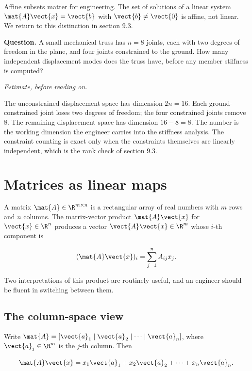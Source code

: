 Affine subsets matter for engineering. The set of solutions of a
linear system $\mat{A}\vect{x} = \vect{b}$ with $\vect{b} \neq
\vect{0}$ is affine, not linear. We return to this distinction in
section 9.3.

\begin{estimation}
\textbf{Question.} A small mechanical truss has $n = 8$ joints, each
with two degrees of freedom in the plane, and four joints constrained
to the ground. How many independent displacement modes does the
truss have, before any member stiffness is computed?

\smallskip
\textit{Estimate, before reading on.}

\smallskip
The unconstrained displacement space has dimension $2n = 16$. Each
ground-constrained joint loses two degrees of freedom; the four
constrained joints remove $8$. The remaining displacement space has
dimension $16 - 8 = 8$. The number is the working dimension the
engineer carries into the stiffness analysis. The constraint
counting is exact only when the constraints themselves are linearly
independent, which is the rank check of section 9.3.
\end{estimation}

\section{Matrices as linear maps}

A matrix $\mat{A} \in \R^{m \times n}$ is a rectangular array of
real numbers with $m$ rows and $n$ columns. The matrix-vector
product $\mat{A}\vect{x}$ for $\vect{x} \in \R^{n}$ produces a
vector $\vect{A}\vect{x} \in \R^{m}$ whose $i$-th component is

\[
(\mat{A}\vect{x})_{i} = \sum_{j=1}^{n} A_{ij} x_{j}.
\]

Two interpretations of this product are routinely useful, and an
engineer should be fluent in switching between them.

\subsection{The column-space view}

Write $\mat{A} = [\vect{a}_{1} \mid \vect{a}_{2} \mid \cdots \mid
\vect{a}_{n}]$, where $\vect{a}_{j} \in \R^{m}$ is the $j$-th column.
Then

\[
\mat{A}\vect{x} = x_{1}\vect{a}_{1} + x_{2}\vect{a}_{2} + \cdots
+ x_{n}\vect{a}_{n}.
\]

